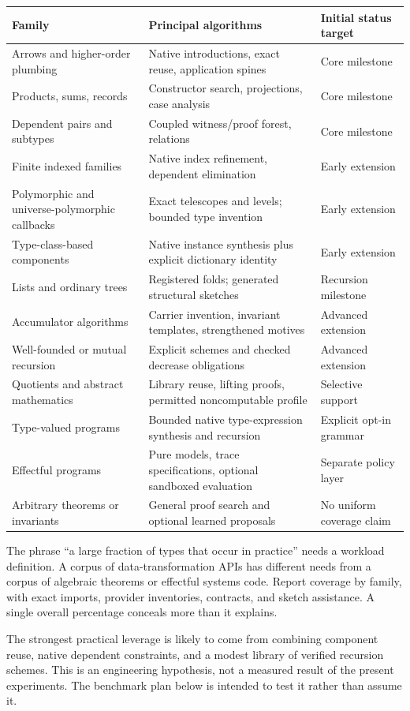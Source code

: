 \begin{longtable}{@{}L{0.28\textwidth}L{0.41\textwidth}L{0.23\textwidth}@{}}
\toprule
Family & Principal algorithms & Initial status target \\
\midrule\endhead
Arrows and higher-order plumbing & Native introductions, exact reuse, application spines & Core milestone \\
Products, sums, records & Constructor search, projections, case analysis & Core milestone \\
Dependent pairs and subtypes & Coupled witness/proof forest, relations & Core milestone \\
Finite indexed families & Native index refinement, dependent elimination & Early extension \\
Polymorphic and universe-polymorphic callbacks & Exact telescopes and levels; bounded type invention & Early extension \\
Type-class-based components & Native instance synthesis plus explicit dictionary identity & Early extension \\
Lists and ordinary trees & Registered folds; generated structural sketches & Recursion milestone \\
Accumulator algorithms & Carrier invention, invariant templates, strengthened motives & Advanced extension \\
Well-founded or mutual recursion & Explicit schemes and checked decrease obligations & Advanced extension \\
Quotients and abstract mathematics & Library reuse, lifting proofs, permitted noncomputable profile & Selective support \\
Type-valued programs & Bounded native type-expression synthesis and recursion & Explicit opt-in grammar \\
Effectful programs & Pure models, trace specifications, optional sandboxed evaluation & Separate policy layer \\
Arbitrary theorems or invariants & General proof search and optional learned proposals & No uniform coverage claim \\
\bottomrule
\end{longtable}

The phrase ``a large fraction of types that occur in practice'' needs a workload definition. A corpus of data-transformation APIs has different needs from a corpus of algebraic theorems or effectful systems code. Report coverage by family, with exact imports, provider inventories, contracts, and sketch assistance. A single overall percentage conceals more than it explains.

The strongest practical leverage is likely to come from combining component reuse, native dependent constraints, and a modest library of verified recursion schemes. This is an engineering hypothesis, not a measured result of the present experiments. The benchmark plan below is intended to test it rather than assume it.
